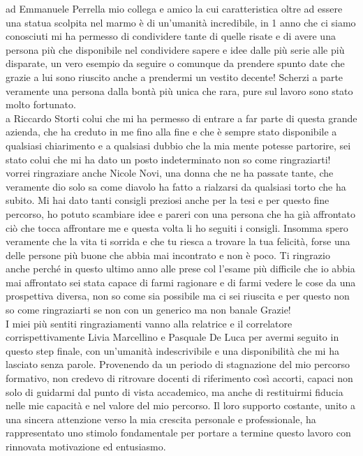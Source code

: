  ad Emmanuele Perrella mio collega e amico la cui caratteristica oltre ad essere una statua scolpita nel marmo è di un'umanità incredibile, in 1 anno che ci siamo conosciuti mi ha permesso di condividere tante di quelle risate e di avere una persona più che disponibile nel condividere sapere e idee dalle più serie alle più disparate, un vero esempio da seguire o comunque da prendere spunto date che grazie a lui sono riuscito anche a prendermi un vestito decente! Scherzi a parte veramente una persona dalla bontà più unica che rara, pure sul lavoro sono stato molto fortunato.\\

a Riccardo Storti colui che mi ha permesso di entrare a far parte di questa grande azienda, che ha creduto in me fino alla fine e che è sempre stato disponibile a qualsiasi chiarimento e a qualsiasi dubbio che la mia mente potesse partorire, sei stato colui che mi ha dato un posto indeterminato non so come ringraziarti!\\

vorrei ringraziare anche Nicole Novi, una donna che ne ha passate tante, che veramente dio solo sa come diavolo ha fatto a rialzarsi da qualsiasi torto che ha subito. Mi hai dato tanti consigli preziosi anche per la tesi e per questo fine percorso, ho potuto scambiare idee e pareri con una persona che ha già affrontato ciò che tocca affrontare me e questa volta li ho seguiti i consigli. Insomma spero veramente che la vita ti sorrida e che tu riesca a trovare la tua felicità, forse una delle persone più buone che abbia mai incontrato e non è poco. Ti ringrazio anche perché in questo ultimo anno alle prese col l'esame più difficile che io abbia mai affrontato sei stata capace di farmi ragionare e di farmi vedere le cose da una prospettiva diversa, non so come sia possibile ma ci sei riuscita e per questo non so come ringraziarti se non con un generico ma non banale Grazie!\\

I miei più sentiti ringraziamenti vanno alla relatrice e il correlatore corrispettivamente Livia Marcellino e Pasquale De Luca per avermi seguito in questo step finale, con un'umanità indescrivibile e una disponibilità che mi ha lasciato senza parole. Provenendo da un periodo di stagnazione del mio percorso formativo, non credevo di ritrovare docenti di riferimento così accorti, capaci non solo di guidarmi dal punto di vista accademico, ma anche di restituirmi fiducia nelle mie capacità e nel valore del mio percorso. Il loro supporto costante, unito a una sincera attenzione verso la mia crescita personale e professionale, ha rappresentato uno stimolo fondamentale per portare a termine questo lavoro con rinnovata motivazione ed entusiasmo.
